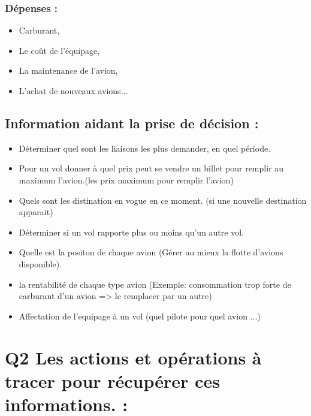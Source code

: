 \documentclass[oneside,13pt,a4paper]{article}
\begin{document}
\subsubsection{Dépenses :}

\begin{itemize}
  \item Carburant, 
  \item Le coût de l’équipage, 
  \item La maintenance de l'avion,
  \item L'achat de nouveaux avions...
\end{itemize}


\subsection{Information aidant la prise de décision :}

\begin{itemize}
  \item Déterminer quel sont les liaisons les plus demander, en quel période.
  \item Pour un vol donner à quel prix peut se vendre un billet pour remplir au maximum l'avion.(les prix maximum pour remplir l'avion)
  \item Quels sont les distination en vogue en ce moment. (si une nouvelle destination apparait)
  \item Déterminer si un vol rapporte plus ou moins qu'un autre vol.
  \item Quelle est la positon de chaque avion (Gérer au mieux la flotte d'avions disponible).
  \item la rentabilité de chaque type avion (Exemple: consommation trop forte de carburant d'un avion => le remplacer par un autre)
  \item Affectation de l'equipage à un vol (quel pilote pour quel avion ...)
\end{itemize}

\section{Q2 Les actions et opérations à tracer pour récupérer ces informations. : }
\end{document}
